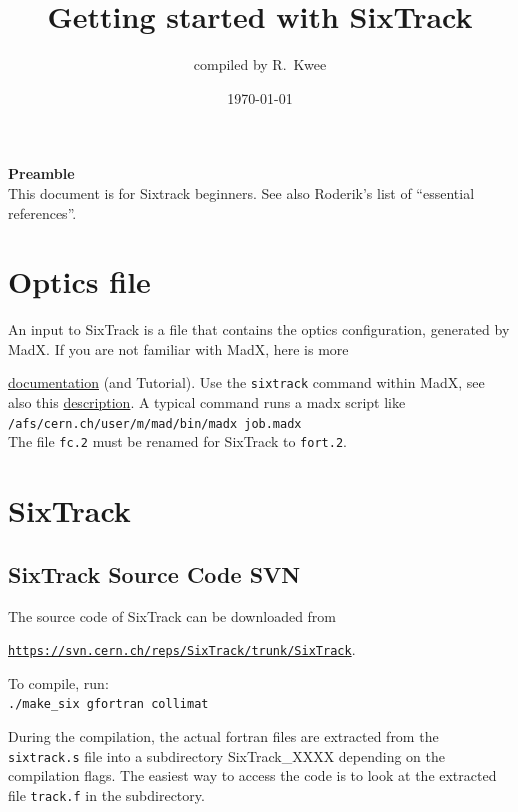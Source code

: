 \documentclass[a4paper, oneside, final]{scrartcl}
\begin{document}
\title{Getting started with SixTrack}
\author{\large{compiled by R.~Kwee}}

\date{\large{\today}}
        \maketitle


\setlength{\parindent}{0cm}
{\LARGE{\textbf{Preamble}}}\\

\noindent This document is for Sixtrack beginners. See also Roderik's list of ``essential references''.
\section{Optics file}

An input to SixTrack is a file that contains the optics configuration, generated by MadX. If you are not familiar with MadX, here is more {\href{http://mad.web.cern.ch/mad/www/documentation.html}{documentation} (and Tutorial). Use the \texttt{sixtrack} command within MadX, see also this {\href{http://frs.home.cern.ch/frs/Xdoc/c6t/c6t.html}{description}}. A typical command runs a madx script like\\

\texttt{/afs/cern.ch/user/m/mad/bin/madx job.madx}\\

The file \texttt{fc.2} must be renamed for SixTrack to \texttt{fort.2}. 

\section{SixTrack}

\subsection{SixTrack Source Code SVN}

The source code of SixTrack can be downloaded from\\ {\href{https://svn.cern.ch/reps/SixTrack/trunk/SixTrack}{\texttt{https://svn.cern.ch/reps/SixTrack/trunk/SixTrack}}. \newline

To compile, run:\\
\texttt{./make\_six gfortran collimat}\newline

During the compilation, the actual fortran files are extracted from the \texttt{sixtrack.s} file into a subdirectory SixTrack\_XXXX depending on the compilation flags. The easiest way to access the code is to look at the extracted file \texttt{track.f} in the subdirectory. 

}}
\end{document}
